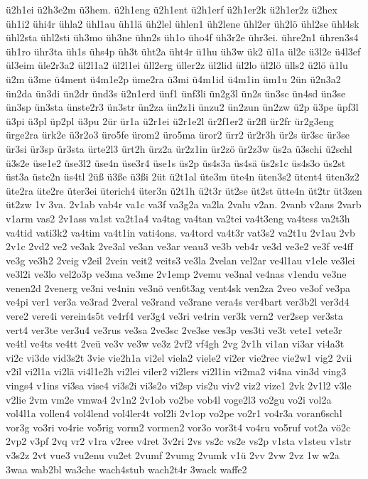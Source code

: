 {ü2h1ei
ü2h3e2m
ü3hem.
ü2h1eng
ü2h1ent
ü2h1erf
ü2h1er2k
ü2h1er2z
ü2hex
üh1i2
ühi4r
ühla2
ühl1au
üh1lä
üh2lel
ühlen1
üh2lene
ühl2er
üh2lö
ühl2se
ühl4sk
ühl2sta
ühl2sti
üh3mo
üh3ne
ühn2s
üh1o
üho4f
üh3r2e
ühr3ei.
ühre2n1
ühren3s4
üh1ro
ühr3ta
üh1s
ühs4p
üh3t
üht2a
üht4r
ü1hu
üh3w
ük2
ül1a
ül2c
ü3l2e
ü4l3ef
ül3eim
üle2r3a2
ül2l1a2
ül2l1ei
üll2erg
üller2z
ül2lid
ül2lo
ül2lö
ülls2
ü2lö
ü1lu
ü2m
ü3me
ü4ment
ü4m1e2p
üme2ra
ü3mi
ü4m1id
ü4m1in
üm1u
2ün
ü2n3a2
ün2da
ün3di
ün2dr
ünd3s
ü2n1erd
ünf1
ünf3li
ün2g3l
ün2s
ün3sc
ün4sd
ün3se
ün3sp
ün3sta
ünste2r3
ün3str
ün2za
ün2z1i
ünzu2
ün2zun
ün2zw
ü2p
ü3pe
üpf3l
ü3pi
ü3pl
üp2pl
ü3pu
2ür
ür1a
ü2r1ei
ü2r1e2l
ür2f1er2
ür2fl
ür2fr
ür2g3eng
ürge2ra
ürk2e
ü3r2o3
üro5fe
ürom2
üro5ma
üror2
ürr2
ür2r3h
ür2s
ür3sc
ür3se
ür3si
ür3sp
ür3sta
ürte2l3
ürt2h
ürz2a
ür2z1in
ür2zö
ür2z3w
üs2a
ü3schi
ü2schl
ü3s2e
üse1e2
üse3l2
üse4n
üse3r4
üse1s
üs2p
üs4s3a
üs4sä
üs2s1c
üs4s3o
üs2st
üst3a
üste2n
üs4tl
2üß
ü3ße
ü3ßi
2üt
ü2t1al
üte3m
üte4n
üten3s2
ütent4
üten3z2
üte2ra
üte2re
üter3ei
üterich4
üter3n
ü2t1h
ü2t3r
üt2se
üt2st
ütte4n
üt2tr
üt3zen
üt2zw
1v
3va.
2v1ab
vab4r
va1c
va3f
va3g2a
va2la
2valu
v2an.
2vanb
v2ans
2varb
v1arm
vas2
2v1ass
va1st
va2t1a4
va4tag
va4tan
va2tei
va4t3eng
va4tess
va2t3h
va4tid
vati3k2
va4tim
va4t1in
vati4ons.
va4tord
va4t3r
vat3s2
va2t1u
2v1au
2vb
2v1c
2vd2
ve2
ve3ak
2ve3al
ve3an
ve3ar
veau3
ve3b
veb4r
ve3d
ve3e2
ve3f
ve4ff
ve3g
ve3h2
2veig
v2eil
2vein
veit2
veits3
ve3la
2velan
vel2ar
ve4l1au
v1ele
ve3lei
ve3l2i
ve3lo
vel2o3p
ve3ma
ve3me
2v1emp
2vemu
ve3nal
ve4nas
v1endu
ve3ne
venen2d
2venerg
ve3ni
ve4nin
ve3nö
ven6t3ag
vent4sk
ven2za
2veo
ve3of
ve3pa
ve4pi
ver1
ver3a
ve3rad
2veral
ve3rand
ve3rane
vera4s
ver4bart
ver3b2l
ver3d4
vere2
vere4i
verein4s5t
ve4rf4
ver3g4
ve3ri
ve4rin
ver3k
vern2
ver2sep
ver3sta
vert4
ver3te
ver3u4
ve3rus
ve3sa
2ve3sc
2ve3se
ves3p
ves3ti
ve3t
vete1
vete3r
ve4tl
ve4ts
ve4tt
2veü
ve3v
ve3w
ve3z
2vf2
vf4gh
2vg
2v1h
vi1an
vi3ar
vi4a3t
vi2c
vi3de
vid3s2t
3vie
vie2h1a
vi2el
viela2
viele2
vi2er
vie2rec
vie2w1
vig2
2vii
v2il
vi2l1a
vi2lä
vi4l1e2h
vi2lei
viler2
vi2lers
vi2l1in
vi2ma2
vi4na
vin3d
ving3
vings4
v1ins
vi3sa
vise4
vi3s2i
vi3s2o
vi2sp
vis2u
viv2
viz2
vize1
2vk
2v1l2
v3le
v2lie
2vm
vm2e
vmwa4
2v1n2
2v1ob
vo2be
vob4l
voge2l3
vo2gu
vo2i
vol2a
vol4l1a
vollen4
vol4lend
vol4ler4t
vol2li
2v1op
vo2pe
vo2r1
vo4r3a
voran6schl
vor3g
vo3ri
vo4rie
vo5rig
vorm2
vormen2
vor3o
vor3t4
vo4ru
vo5ruf
vot2a
vö2c
2vp2
v3pf
2vq
vr2
v1ra
v2ree
v4ret
3v2ri
2vs
vs2c
vs2e
vs2p
v1sta
v1steu
v1str
v3s2z
2vt
vue3
vu2enu
vu2et
2vumf
2vumg
2vumk
v1ü
2vv
2vw
2vz
1w
w2a
3waa
wab2bl
wa3che
wach4stub
wach2t4r
3wack
waffe2
}
